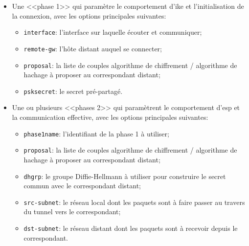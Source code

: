 \documentclass[12pt, oneside, a4paper, titlepage]{report}
\begin{document}
\begin{itemize}
    \item Une <<phase 1>> qui paramètre le comportement d'\gls{ike} et
        l'initialisation de la connexion, avec les options principales suivantes:

    \begin{itemize}
        \item \texttt{interface}: l'interface sur laquelle écouter et
            communiquer;
        \item \texttt{remote-gw}: l'hôte distant auquel se connecter;
        \item \texttt{proposal}: la liste de couples algorithme de chiffrement /
            algorithme de hachage à proposer au correspondant distant;
        \item \texttt{psksecret}: le secret pré-partagé.
    \end{itemize}

    \item Une ou plusieurs <<phases 2>> qui paramètrent le comportement
        d'\gls{esp} et la communication effective, avec les options principales
        suivantes:

    \begin{itemize}
        \item \texttt{phase1name}: l'identifiant de la phase 1 à utiliser;
        \item \texttt{proposal}: la liste de couples algorithme de chiffrement /
            algorithme de hachage à proposer au correspondant distant;
        \item \texttt{dhgrp}: le groupe Diffie-Hellmann à utiliser pour
            construire le secret commun avec le correspondant distant;
        \item \texttt{src-subnet}: le réseau local dont les paquets sont à faire
            passer au travers du tunnel vers le correspondant;
        \item \texttt{dst-subnet}: le réseau distant dont les paquets sont à
            recevoir depuis le correspondant.
    \end{itemize}
\end{itemize}
\end{document}
